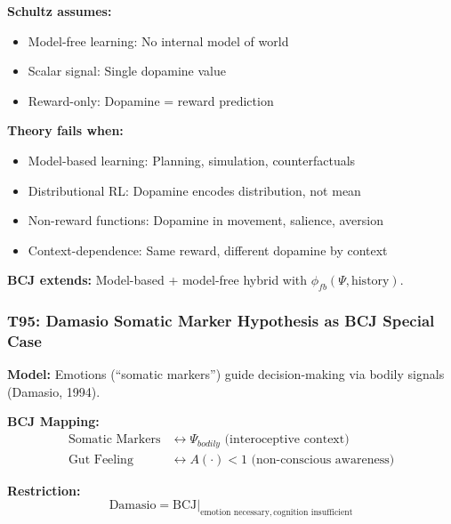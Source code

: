 \begin{tcolorbox}[colback=red!5!white, colframe=red!75!black,
    title=Boundary Condition: Where Schultz Fails]
\textbf{Schultz assumes:}
\begin{itemize}[nosep]
\item Model-free learning: No internal model of world
\item Scalar signal: Single dopamine value
\item Reward-only: Dopamine = reward prediction
\end{itemize}

\textbf{Theory fails when:}
\begin{itemize}[nosep]
\item Model-based learning: Planning, simulation, counterfactuals
\item Distributional RL: Dopamine encodes distribution, not mean
\item Non-reward functions: Dopamine in movement, salience, aversion
\item Context-dependence: Same reward, different dopamine by context
\end{itemize}

\textbf{BCJ extends:} Model-based + model-free hybrid with $\phi_{fb}(\Psi, \text{history})$.
\end{tcolorbox}

\subsubsection*{T95: Damasio Somatic Marker Hypothesis as BCJ Special Case}

\textbf{Model:} Emotions (``somatic markers'') guide decision-making via bodily signals (Damasio, 1994).

\textbf{BCJ Mapping:}
\begin{align}
\text{Somatic Markers} &\leftrightarrow \Psi_{bodily} \text{ (interoceptive context)} \\
\text{Gut Feeling} &\leftrightarrow A(\cdot) < 1 \text{ (non-conscious awareness)}
\end{align}

\textbf{Restriction:}
\begin{equation}
\text{Damasio} = \text{BCJ} \big|_{\text{emotion necessary}, \, \text{cognition insufficient}}
\end{equation}


